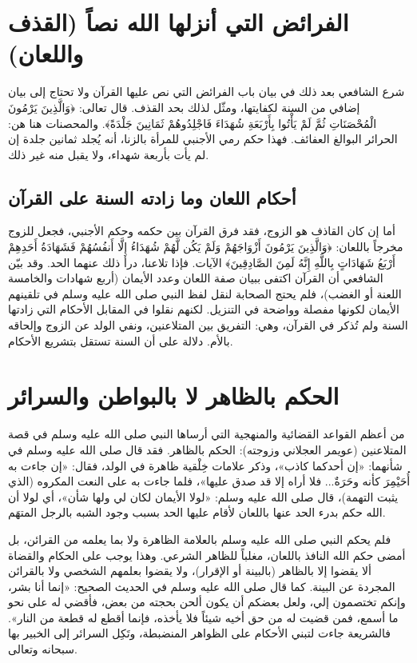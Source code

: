 \section{الفرائض التي أنزلها الله نصاً (القذف واللعان)}
شرع الشافعي بعد ذلك في بيان باب الفرائض التي نص عليها القرآن ولا تحتاج إلى بيان إضافي من السنة لكفايتها، ومثّل لذلك بحد القذف. قال تعالى: ﴿وَالَّذِينَ يَرْمُونَ الْمُحْصَنَاتِ ثُمَّ لَمْ يَأْتُوا بِأَرْبَعَةِ شُهَدَاءَ فَاجْلِدُوهُمْ ثَمَانِينَ جَلْدَةً﴾. والمحصنات هنا هن: الحرائر البوالغ العفائف.
فهذا حكم رمي الأجنبي للمرأة بالزنا، أنه يُجلد ثمانين جلدة إن لم يأت بأربعة شهداء، ولا يقبل منه غير ذلك.

\subsection{أحكام اللعان وما زادته السنة على القرآن}
أما إن كان القاذف هو الزوج، فقد فرق القرآن بين حكمه وحكم الأجنبي، فجعل للزوج مخرجاً باللعان: ﴿وَالَّذِينَ يَرْمُونَ أَزْوَاجَهُمْ وَلَمْ يَكُن لَّهُمْ شُهَدَاءُ إِلَّا أَنفُسُهُمْ فَشَهَادَةُ أَحَدِهِمْ أَرْبَعُ شَهَادَاتٍ بِاللَّهِ إِنَّهُ لَمِنَ الصَّادِقِينَ﴾ الآيات.
فإذا تلاعنا، درأ ذلك عنهما الحد. وقد بيّن الشافعي أن القرآن اكتفى ببيان صفة اللعان وعدد الأيمان (أربع شهادات والخامسة اللعنة أو الغضب)، فلم يحتج الصحابة لنقل لفظ النبي صلى الله عليه وسلم في تلقينهم الأيمان لكونها مفصلة وواضحة في التنزيل. 
لكنهم نقلوا في المقابل الأحكام التي زادتها السنة ولم تُذكر في القرآن، وهي: التفريق بين المتلاعنين، ونفي الولد عن الزوج وإلحاقه بالأم. دلالة على أن السنة تستقل بتشريع الأحكام.

\section{الحكم بالظاهر لا بالبواطن والسرائر}
من أعظم القواعد القضائية والمنهجية التي أرساها النبي صلى الله عليه وسلم في قصة المتلاعنين (عويمر العجلاني وزوجته): الحكم بالظاهر. 
فقد قال صلى الله عليه وسلم في شأنهما: «إن أحدكما كاذب»، وذكر علامات خِلْقية ظاهرة في الولد، فقال: «إن جاءت به أُحَيْمِرَ كأنه وحَرَةٌ... فلا أراه إلا قد صدق عليها»، فلما جاءت به على النعت المكروه (الذي يثبت التهمة)، قال صلى الله عليه وسلم: «لولا الأيمان لكان لي ولها شأن»، أي لولا أن الله حكم بدرء الحد عنها باللعان لأقام عليها الحد بسبب وجود الشبه بالرجل المتهَم.

فلم يحكم النبي صلى الله عليه وسلم بالعلامة الظاهرة ولا بما يعلمه من القرائن، بل أمضى حكم الله النافذ باللعان، مغلباً للظاهر الشرعي.
وهذا يوجب على الحكام والقضاة ألا يقضوا إلا بالظاهر (بالبينة أو الإقرار)، ولا يقضوا بعلمهم الشخصي ولا بالقرائن المجردة عن البينة. كما قال صلى الله عليه وسلم في الحديث الصحيح: «إنما أنا بشر، وإنكم تختصمون إلي، ولعل بعضكم أن يكون ألحن بحجته من بعض، فأقضي له على نحو ما أسمع، فمن قضيت له من حق أخيه شيئاً فلا يأخذه، فإنما أقطع له قطعة من النار». 
فالشريعة جاءت لتبني الأحكام على الظواهر المنضبطة، وتَكِل السرائر إلى الخبير بها سبحانه وتعالى.